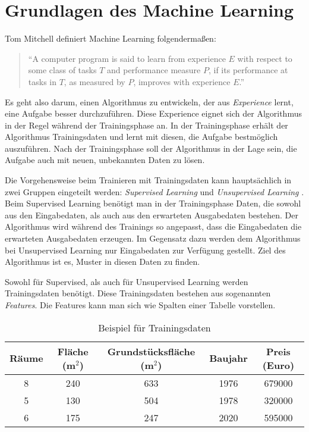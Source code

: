 
\chapter{Grundlagen des Machine Learning}

Tom Mitchell definiert Machine Learning folgendermaßen:
\begin{quote}
    \enquote{A computer program is said to learn from experience $E$ with respect to some class of tasks $T$ and performance measure $P$, if its performance at tasks in $T$, as measured by $P$, improves with experience $E$.} \cite{mitchell1997}
\end{quote}

Es geht also darum, einen Algorithmus zu entwickeln, der aus \textit{Experience} lernt, eine Aufgabe besser durchzuführen. Diese Experience eignet sich der Algorithmus in der Regel während der Trainingsphase an. In der Trainingsphase erhält der Algorithmus Trainingsdaten und lernt mit diesen, die Aufgabe bestmöglich auszuführen. Nach der Trainingsphase soll der Algorithmus in der Lage sein, die Aufgabe auch mit neuen, unbekannten Daten zu lösen.

Die Vorgehensweise beim Trainieren mit Trainingsdaten kann hauptsächlich in zwei Gruppen eingeteilt werden: \textit{Supervised Learning} und \textit{Unsupervised Learning} \cite{Sarkar2018}. Beim Supervised Learning benötigt man in der Trainingsphase Daten, die sowohl aus den Eingabedaten, als auch aus den erwarteten Ausgabedaten bestehen. Der Algorithmus wird während des Trainings so angepasst, dass die Eingabedaten die erwarteten Ausgabedaten erzeugen. Im Gegensatz dazu werden dem Algorithmus bei Unsupervised Learning nur Eingabedaten zur Verfügung gestellt. Ziel des Algorithmus ist es, Muster in diesen Daten zu finden.

Sowohl für Supervised, als auch für Unsupervised Learning werden Trainingsdaten benötigt. Diese Trainingsdaten bestehen aus sogenannten \textit{Features}. Die Features kann man sich wie Spalten einer Tabelle vorstellen.

\begin{table}[H]
    \centering
    \begin{tabular}{ || c | c | c | c || c || }
        \hline
        Räume & Fläche (m$^2$) & Grundstücksfläche (m$^2$) & Baujahr & Preis (Euro) \\
        \hline
        8 & 240 & 633 & 1976 & 679000 \\
        5 & 130 & 504 & 1978 & 320000 \\
        6 & 175 & 247 & 2020 & 595000 \\
        \hline
    \end{tabular}
    \caption{Beispiel für Trainingsdaten}
    \label{tbl:trainingdata}
\end{table}


